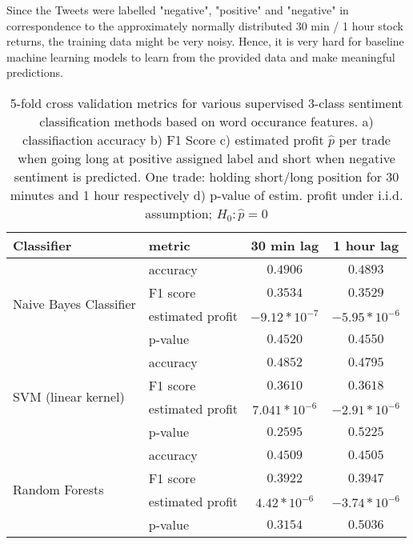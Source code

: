 \documentclass[a4paper,12pt]{article}%
\begin{document}
Since the Tweets were labelled "negative", "positive" and "negative" in correspondence to the approximately normally distributed 30 min / 1 hour stock returns, the training data might be very noisy. Hence, it is very hard for baseline machine learning models to learn from the provided data and make meaningful predictions.

\begin{table}
\centering
\captionsetup{justification=centering}
\begin{tabular}{ |l|l|c|c| }
\hline
Classifier & metric & 30 min lag & 1 hour lag \\ \hline
\multirow{4}{*}{Naive Bayes Classifier} & accuracy & $0.4906$ & $0.4893$ \\
 & F1 score & $0.3534$ & $0.3529$ \\
 & estimated profit & $-9.12 * 10^{-7}$ & $-5.95 * 10^{-6}$ \\ 
 & p-value & $0.4520$& $0.4550$\\ \hline
\multirow{4}{*}{SVM (linear kernel)} & accuracy & $0.4852$ & $0.4795$ \\
 & F1 score & $0.3610$ & $0.3618$ \\
 & estimated profit & $7.041 * 10^{-6}$ & $-2.91 * 10^{-6}$ \\
  & p-value & $0.2595$ & $0.5225$\\ \hline
\multirow{4}{*}{Random Forests} & accuracy & $0.4509$ & $0.4505$ \\
 & F1 score & $0.3922$ & $0.3947$ \\
 & estimated profit & $4.42 * 10^{-6}$ & $-3.74 * 10^{-6}$ \\
  & p-value & $0.3154$ & $0.5036$ \\ \hline
\end{tabular}
\caption[Validation Metrics - Predicting Short-Term Stock Returns With Basic Machine Learning Classifiers]{5-fold cross validation metrics for various supervised 3-class sentiment classification methods based on word occurance features. a) classifiaction accuracy b) F1 Score c) estimated profit $\hat{p}$ per trade when going long at positive assigned label and short when negative sentiment is predicted. One trade: holding short/long position for 30 minutes and 1 hour respectively d) p-value of estim. profit under i.i.d. assumption; $H_0: \hat{p}=0$ \label{table:bag-of-words-results}}
\end{table}
\end{document}
